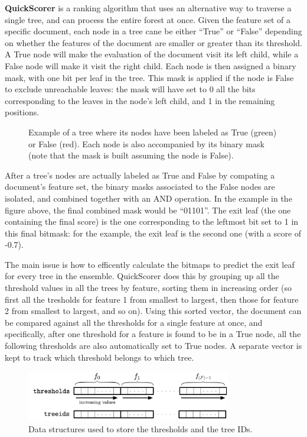 \textbf{QuickScorer} is a ranking algorithm that uses an alternative way to traverse a single tree, and can process the entire forest at once. Given the feature set of a specific document, each node in a tree cane be either ``True'' or ``False'' depending on whether the features of the document are smaller or greater than its threshold. A True node will make the evaluation of the document visit its left child, while a False node will make it visit the right child. Each node is then assigned a binary mask, with one bit per leaf in the tree. This mask is applied if the node is False to exclude unreachable leaves: the mask will have set to 0 all the bits corresponding to the leaves in the node's left child, and 1 in the remaining positions.
\begin{figure}[H]
    \centering
    
    \caption{Example of a tree where its nodes have been labeled as True (green) or False (red). Each node is also accompanied by its binary mask (note that the mask is built assuming the node is False).}
\end{figure}
After a tree's nodes are actually labeled as True and False by compating a document's feature set, the binary masks associated to the False nodes are isolated, and combined together with an AND operation. In the example in the figure above, the final combined mask would be ``01101''. The exit leaf (the one containing the final score) is the one corresponding to the leftmost bit set to 1 in this final bitmask: for the example, the exit leaf is the second one (with a score of -0.7).

The main issue is how to efficently calculate the bitmaps to predict the exit leaf for every tree in the ensemble. QuickScorer does this by grouping up all the threshold values in all the trees by feature, sorting them in increasing order (so first all the tresholds for feature 1 from smallest to largest, then those for feature 2 from smallest to largest, and so on). Using this sorted vector, the document can be compared against all the thresholds for a single feature at once, and specifically, after one threshold for a feature is found to be in a True node, all the following thresholds are also automatically set to True nodes. A separate vector is kept to track which threshold belongs to which tree.

\begin{figure}[H]
    \centering
    \includegraphics[width=0.8\textwidth]{img/QuickScorer2.png}
    \caption{Data structures used to store the thresholds and the tree IDs.}
\end{figure}